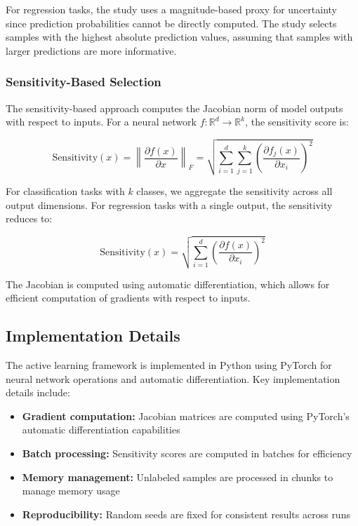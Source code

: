 \documentclass[conference]{IEEEtran}
\begin{document}
For regression tasks, the study uses a magnitude-based proxy for uncertainty since prediction probabilities cannot be directly computed. The study selects samples with the highest absolute prediction values, assuming that samples with larger predictions are more informative.

\subsubsection{Sensitivity-Based Selection}

The sensitivity-based approach computes the Jacobian norm of model outputs with respect to inputs. For a neural network $f: \mathbb{R}^d \rightarrow \mathbb{R}^k$, the sensitivity score is:

\begin{equation}
\text{Sensitivity}(x) = \left\|\frac{\partial f(x)}{\partial x}\right\|_F = \sqrt{\sum_{i=1}^d \sum_{j=1}^k \left(\frac{\partial f_j(x)}{\partial x_i}\right)^2}
\end{equation}

For classification tasks with $k$ classes, we aggregate the sensitivity across all output dimensions. For regression tasks with a single output, the sensitivity reduces to:

\begin{equation}
\text{Sensitivity}(x) = \sqrt{\sum_{i=1}^d \left(\frac{\partial f(x)}{\partial x_i}\right)^2}
\end{equation}

The Jacobian is computed using automatic differentiation, which allows for efficient computation of gradients with respect to inputs.

\subsection{Implementation Details}

The active learning framework is implemented in Python using PyTorch for neural network operations and automatic differentiation. Key implementation details include:

\begin{itemize}
\item \textbf{Gradient computation:} Jacobian matrices are computed using PyTorch's automatic differentiation capabilities
\item \textbf{Batch processing:} Sensitivity scores are computed in batches for efficiency
\item \textbf{Memory management:} Unlabeled samples are processed in chunks to manage memory usage
\item \textbf{Reproducibility:} Random seeds are fixed for consistent results across runs
\end{itemize}
\end{document}
